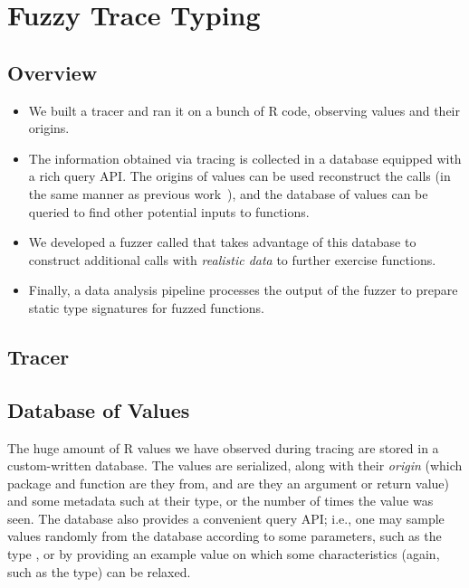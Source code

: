 \documentclass[sigplan,anonymous,review]{acmart}
\begin{document}

\section{Fuzzy Trace Typing}
\label{sec:fuzzy}

\subsection{Overview}

\begin{itemize}
    \item We built a tracer and ran it on a bunch of R code, observing values and their origins. 
    \item The information obtained via tracing is collected in a database equipped with a rich query API. 
    The origins of values can be used reconstruct the calls (in the same manner as previous work~\cite{turcotte2020designing}), and the database of values can be queried to find other potential inputs to functions.
    \item We developed a fuzzer called \tool that takes advantage of this database to construct additional calls with \textit{realistic data} to further exercise functions.
    \item Finally, a data analysis pipeline processes the output of the fuzzer to prepare static type signatures for fuzzed functions.
\end{itemize}

\subsection{Tracer}


\subsection{Database of Values}

The huge amount of R values we have observed during tracing are stored in a custom-written database. 
The values are serialized, along with their \textit{origin} (which package and function are they from, and are they an argument or return value) and some metadata such at their type, or the number of times the value was seen. 
The database also provides a convenient query API; i.e., one may sample values randomly from the database according to some parameters, such as the type , or by providing an example value on which some characteristics (again, such as the type) can be relaxed.
\end{document}
